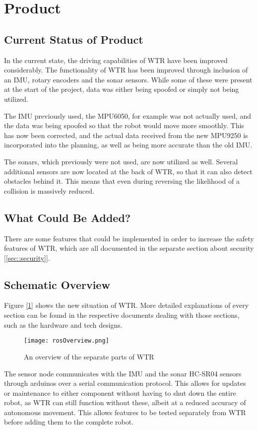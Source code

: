 \section{Product}
\subsection{Current Status of Product}
In the current state, the driving capabilities of WTR have been improved considerably.
The functionality of WTR has been improved through inclusion of an IMU, rotary encoders and the sonar sensors.
While some of these were present at the start of the project, data was either being spoofed or simply not being utilized.

The IMU previously used, the MPU6050, for example was not actually used, and the data was being spoofed so that the robot would move more smoothly.
This has now been corrected, and the actual data received from the new MPU9250 is incorporated into the planning, as well as being more accurate than the old IMU.

The sonars, which previously were not used, are now utilized as well.
Several additional sensors are now located at the back of WTR, so that it can also detect obstacles behind it.
This means that even during reversing the likelihood of a collision is massively reduced.

\subsection{What Could Be Added?}
There are some features that could be implemented in order to increase the safety features of WTR, which are all documented in the separate section about security [\ref{sec::security}].

\subsection{Schematic Overview}
Figure [\ref{fig::schemView}] shows the new situation of WTR.
More detailed explanations of every section can be found in the respective documents dealing with those sections, such as the hardware and tech designs.
\begin{figure}[H]
\centering
\texttt{[image: rosOverview.png]}
\caption{An overview of the separate parts of WTR}
\label{fig::schemView}
\end{figure}

The sensor node communicates with the IMU and the sonar HC-SR04 sensors through arduinos over a serial communication protocol.
This allows for updates or maintenance to either component without having to shut down the entire robot, as WTR can still function without these, albeit at a reduced accuracy of autonomous movement.
This allows features to be tested separately from WTR before adding them to the complete robot.

